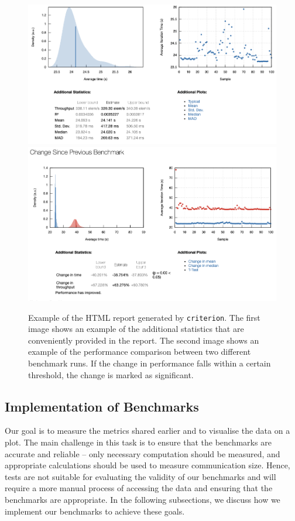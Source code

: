 \begin{figure}
  \centering
  \includegraphics[width=0.9\linewidth]{../assets/html-report-example.png}
  \includegraphics[width=0.9\linewidth]{../assets/performance-change-examplel.png}
  \caption{Example of the HTML report generated by \texttt{criterion}.
  The first image shows an example of the additional statistics that are 
  conveniently provided in the report. The second image shows an example of 
  the performance comparison between two different benchmark runs. If the 
  change in performance falls within a certain threshold, the change is marked as 
  significant.
  }
  \label{fig:criterion-report}
\end{figure}

\subsection{Implementation of Benchmarks}
\label{sec:benchmarks-implementation}
Our goal is to measure the metrics shared earlier and to visualise the data on 
a plot. The main challenge in this task is to ensure that the benchmarks are 
accurate and reliable -- only necessary computation should be measured, and 
appropriate calculations should be used to measure communication size. Hence, 
tests are not suitable for evaluating the validity of our benchmarks and 
will require a more manual process of accessing the data and ensuring that
the benchmarks are appropriate. In the following subsections, we discuss how 
we implement our benchmarks to achieve these goals. 

